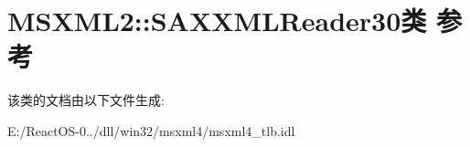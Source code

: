 \hypertarget{class_m_s_x_m_l2_1_1_s_a_x_x_m_l_reader30}{}\section{M\+S\+X\+M\+L2\+:\+:S\+A\+X\+X\+M\+L\+Reader30类 参考}
\label{class_m_s_x_m_l2_1_1_s_a_x_x_m_l_reader30}


该类的文档由以下文件生成\+:\begin{DoxyCompactItemize}
\item 
E\+:/\+React\+O\+S-\/0../dll/win32/msxml4/msxml4\+\_\+tlb.\+idl\end{DoxyCompactItemize}
